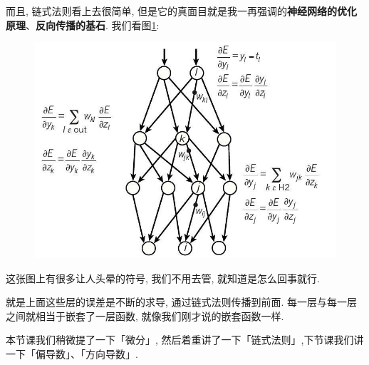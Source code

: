 而且, 链式法则看上去很简单, 但是它的真面目就是我一再强调的\textbf{神经网络的优化原理}、\textbf{反向传播的基石}. 我们看图\ref{fig:img11_1}:

\begin{figure}[ht]
  \centering
  \includegraphics[width=0.8\linewidth]{asset/20200603174921-1878265324_jpeg_759_542_46786.jpg}
  \caption{}
  \label{fig:img11_1}
\end{figure}

这张图上有很多让人头晕的符号, 我们不用去管, 就知道是怎么回事就行. 

就是上面这些层的误差是不断的求导, 通过链式法则传播到前面. 每一层与每一层之间就相当于嵌套了一层函数, 就像我们刚才说的嵌套函数一样. 

本节课我们稍微提了一下「微分」, 然后着重讲了一下「链式法则」,下节课我们讲一下「偏导数」、「方向导数」. 